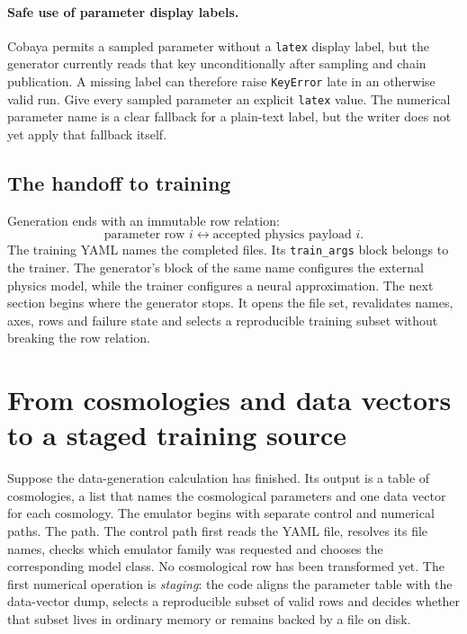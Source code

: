 \documentclass[10pt,aps,prd,twocolumn,nofootinbib]{revtex4-2}
\newcommand{\code}[1]{\texttt{#1}}
\begin{document}
\paragraph{Safe use of parameter display labels.}
Cobaya permits a sampled parameter without a \code{latex} display label, but
the generator currently reads that key unconditionally after sampling and
chain publication.  A missing label can therefore raise \code{KeyError} late
in an otherwise valid run.  Give every sampled parameter an explicit
\code{latex} value.  The numerical parameter name is a clear fallback for a
plain-text label, but the writer does not yet apply that fallback itself.

\subsection{The handoff to training}

Generation ends with an immutable row relation:
\begin{equation*}
  \text{parameter row }i
  \longleftrightarrow
  \text{accepted physics payload }i.
\end{equation*}
The training YAML names the completed files.  Its \code{train\_args} block
belongs to the trainer.  The generator's block of the same name configures the
external physics model, while the trainer configures a neural approximation.
The next section begins where the generator stops.  It opens the file set,
revalidates names, axes, rows and failure state and selects a reproducible
training subset without breaking the row relation.

\section{From cosmologies and data vectors to a staged training source}
\label{chap:staging}

Suppose the data-generation calculation has finished.  Its output is a table of
cosmologies, a list that names the cosmological parameters and one data
vector for each cosmology.  The emulator begins with separate control and
numerical paths.  The
path.  The control path first reads the YAML file, resolves its file names,
checks which emulator family was requested and chooses the corresponding
model class.  No cosmological row has been transformed yet.  The first
numerical operation is \emph{staging}: the code aligns the parameter table
with the data-vector dump, selects a reproducible subset of valid rows and
decides whether that subset lives in ordinary memory or remains backed by a
file on disk.
\end{document}
